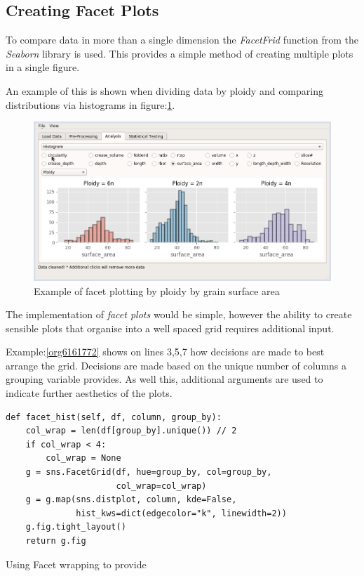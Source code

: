 \documentclass[11pt]{report}
\begin{document}
\clearpage
\subsection{Creating Facet Plots}
\label{sec:org0ff7bcb}

To compare data in more than a single dimension the \emph{FacetFrid} function from the \emph{Seaborn} library is used. This provides a simple method of creating multiple plots in a single figure.

An example of this is shown when dividing data by ploidy and comparing distributions via histograms in figure:\ref{fig:org8c4f210}.

\begin{figure}[htbp]
\centering
\includegraphics[width=12cm]{./images/facet_example.png}
\caption{\label{fig:org8c4f210}
Example of facet plotting by ploidy by grain surface area}
\end{figure}

The implementation of \emph{facet plots} would be simple, however the ability to create sensible plots that organise into a well spaced grid requires additional input.

Example:\ref{org6161772} shows on lines 3,5,7 how decisions are made to best arrange the grid. Decisions are made based on the unique number of columns a grouping variable provides. As well this,  additional arguments are  used to indicate further aesthetics of the plots.

\begin{listing}[htbp]
\begin{verbatim}
def facet_hist(self, df, column, group_by):
    col_wrap = len(df[group_by].unique()) // 2
    if col_wrap < 4:
        col_wrap = None
    g = sns.FacetGrid(df, hue=group_by, col=group_by,
                      col_wrap=col_wrap)
    g = g.map(sns.distplot, column, kde=False,
              hist_kws=dict(edgecolor="k", linewidth=2))
    g.fig.tight_layout()
    return g.fig
\end{verbatim}
\caption{\label{org6161772}
Using Facet wrapping to provide}
\end{listing}
\end{document}

